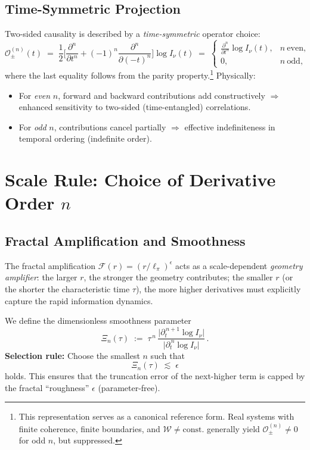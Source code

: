 \subsection{Time-Symmetric Projection}
Two-sided causality is described by a \emph{time-symmetric} operator choice:
\begin{equation}
\label{eq:symmetric}
\mathcal{O}^{(n)}_{\pm}(t)\;=\;\frac{1}{2}\Biggl[
\frac{\partial^{n}}{\partial t^{n}} + (-1)^{n}\frac{\partial^{n}}{\partial (-t)^{n}}
\Biggr]\log I_\nu(t)
\;=\;\begin{cases}
\displaystyle \frac{\partial^{n}}{\partial t^{n}}\log I_\nu(t), & n\ \text{even},\\[1.0ex]
\displaystyle 0, & n\ \text{odd},
\end{cases}
\end{equation}
where the last equality follows from the parity property.\footnote{%
This representation serves as a canonical reference form. Real systems with finite
coherence, finite boundaries, and \(\mathcal{W}\neq \mathrm{const.}\) generally yield
\(\mathcal{O}^{(n)}_{\pm}\neq 0\) for odd \(n\), but suppressed.}
Physically:
\begin{itemize}
  \item For \emph{even} \(n\), forward and backward contributions add constructively
  \(\Rightarrow\) enhanced sensitivity to two-sided (time-entangled) correlations.
  \item For \emph{odd} \(n\), contributions cancel partially
  \(\Rightarrow\) effective indefiniteness in temporal ordering (indefinite order).
\end{itemize}

\section{Scale Rule: Choice of Derivative Order \(n\)}
\subsection{Fractal Amplification and Smoothness}
The fractal amplification \(\mathcal{F}(r)=(r/\ell_\pi)^{\epsilon}\) acts as a scale-dependent
\emph{geometry amplifier}: the larger \(r\), the stronger the geometry contributes;
the smaller \(r\) (or the shorter the characteristic time \(\tau\)), the more higher
derivatives must explicitly capture the rapid information dynamics.

We define the dimensionless smoothness parameter
\begin{equation}
\label{eq:xi}
\Xi_n(\tau)\;:=\;\tau^{\,n}\,
\frac{\bigl|\partial_t^{\,n+1}\log I_\nu\bigr|}{\bigl|\partial_t^{\,n}\log I_\nu\bigr|}\,.
\end{equation}
\textbf{Selection rule:} Choose the smallest \(n\) such that
\begin{equation}
\label{eq:rule}
\Xi_n(\tau)\;\lesssim\;\epsilon
\end{equation}
holds. This ensures that the truncation error of the next-higher term is capped
by the fractal “roughness” \(\epsilon\) (parameter-free).

